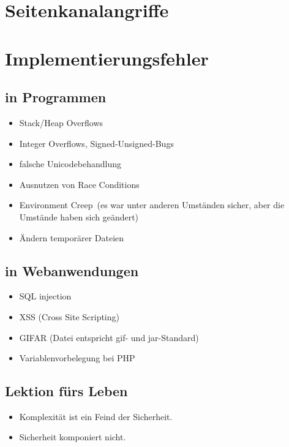 \documentclass[a4paper,twoside,DIV15,BCOR12mm]{scrbook}
\begin{document}

\chapter{Seitenkanalangriffe}



\chapter{Implementierungsfehler}

\section{in Programmen}

\begin{itemize}
	\item Stack/Heap Overflows
	\item Integer Overflows, Signed-Unsigned-Bugs
	\item falsche Unicodebehandlung
	\item Ausnutzen von Race Conditions
	\item \glqq Environment Creep\grqq\ (es war unter anderen Umständen sicher, aber die Umstände haben sich geändert)
	\item Ändern temporärer Dateien
\end{itemize}

\section{in Webanwendungen}

\begin{itemize}
	\item SQL injection
	\item XSS (Cross Site Scripting)
	\item GIFAR (Datei entspricht gif- und jar-Standard)
	\item Variablenvorbelegung bei PHP
\end{itemize}

\section{Lektion fürs Leben}

\begin{itemize}
	\item Komplexität ist ein Feind der Sicherheit.
	\item Sicherheit komponiert nicht.
\end{itemize}
\end{document}
